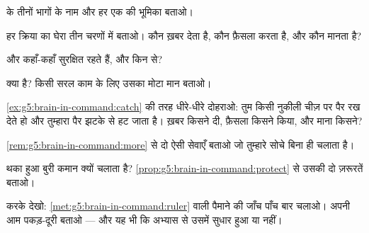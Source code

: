 \begin{exercise}[$\star$]\label{exo:g5:brain-in-command:1}
 के तीनों भागों के नाम और हर एक की भूमिका बताओ।
\end{exercise}

\begin{exercise}[$\star$]\label{exo:g5:brain-in-command:2}
हर क्रिया का घेरा तीन चरणों में बताओ। कौन ख़बर देता है, कौन फ़ैसला करता
है, और कौन मानता है?
\end{exercise}

\begin{exercise}[$\star$]\label{exo:g5:brain-in-command:3}
 और  कहाँ-कहाँ सुरक्षित रहते हैं, और किन 
से?
\end{exercise}

\begin{exercise}[$\star$]\label{exo:g5:brain-in-command:4}
 क्या है? किसी सरल काम के लिए उसका मोटा मान बताओ।
\end{exercise}

\begin{exercise}[$\star$]\label{exo:g5:brain-in-command:5}
\cref{ex:g5:brain-in-command:catch} की तरह धीरे-धीरे दोहराओ: तुम किसी
नुकीली चीज़ पर पैर रख देते हो और तुम्हारा पैर झटके से हट जाता है।
ख़बर किसने दी, फ़ैसला किसने किया, और माना किसने?
\end{exercise}

\begin{exercise}[$\star$]\label{exo:g5:brain-in-command:6}
\cref{rem:g5:brain-in-command:more} से दो ऐसी सेवाएँ बताओ जो 
तुम्हारे सोचे बिना ही चलाता है।
\end{exercise}

\begin{exercise}[$\star$]\label{exo:g5:brain-in-command:7}
थका हुआ  बुरी कमान क्यों चलाता है?
\cref{prop:g5:brain-in-command:protect} से उसकी दो ज़रूरतें बताओ।
\end{exercise}

\begin{exercise}[$\star$]\label{exo:g5:brain-in-command:8}
करके देखो: \cref{met:g5:brain-in-command:ruler} वाली पैमाने की जाँच
पाँच बार चलाओ। अपनी आम पकड़-दूरी बताओ --- और यह भी कि अभ्यास से उसमें
सुधार हुआ या नहीं।
\end{exercise}

